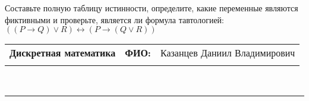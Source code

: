 \documentclass[10pt]{exam}
\newcommand{\class}{Дискретная математика}
\newcommand{\examdate}{}
\begin{document}
\begin{questions}
\begin{enumerate}[a)]
\end{enumerate}\question Составьте полную таблицу истинности, определите, какие переменные являются фиктивными и проверьте, является ли формула тавтологией:
$((P \rightarrow Q) \lor R) \leftrightarrow (P \rightarrow (Q \lor R))$

\end{questions}
\newpage
\begin{flushright}
\begin{tabular}{p{2.8in} r l}
\textbf{\class} & \textbf{ФИО:} &Казанцев Даниил Владимирович
\\

\textbf{\examdate} &&\\
\end{tabular}\\
\end{flushright}
\rule[1ex]{\textwidth}{.1pt}
\end{document}
